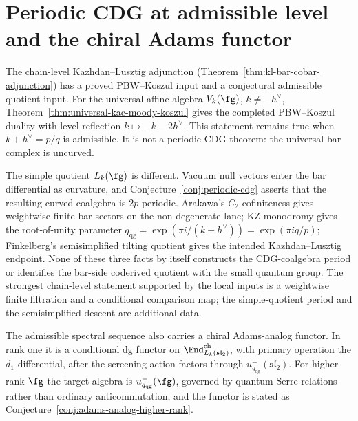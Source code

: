 %
%

\chapter{Periodic CDG at admissible level and the chiral Adams functor}
\label{chap:periodic-cdg-admissible}

The chain-level Kazhdan--Lusztig adjunction
\textup{(}Theorem~\ref{thm:kl-bar-cobar-adjunction}\textup{)} has a
proved PBW--Koszul input and a conjectural admissible quotient input.
For the universal affine algebra $V_k(\fg)$, $k\neq -h^\vee$,
Theorem~\ref{thm:universal-kac-moody-koszul} gives the completed
PBW--Koszul duality with level reflection $k\mapsto -k-2h^\vee$.
This statement remains true when $k+h^\vee=p/q$ is admissible.  It is
not a periodic-CDG theorem: the universal bar complex is uncurved.

The simple quotient $L_k(\fg)$ is different.  Vacuum null vectors enter
the bar differential as curvature, and Conjecture~\ref{conj:periodic-cdg}
asserts that the resulting curved coalgebra is $2p$-periodic.  Arakawa's
$C_2$-cofiniteness gives weightwise finite bar sectors on the
non-degenerate lane; KZ monodromy gives the root-of-unity parameter
$q_{\mathrm{qg}}=\exp(\pi i/(k+h^\vee))=\exp(\pi i q/p)$; Finkelberg's
semisimplified tilting quotient gives the intended Kazhdan--Lusztig
endpoint.  None of these three facts by itself constructs the
CDG-coalgebra period or identifies the bar-side coderived quotient with
the small quantum group.  The strongest chain-level statement supported
by the local inputs is a weightwise finite filtration and a conditional
comparison map; the simple-quotient period and the semisimplified
descent are additional data.

The admissible spectral sequence also carries a chiral Adams-analog
functor.  In rank one it is a conditional
dg functor on $\End^{\mathrm{ch}}_{L_k(\mathfrak{sl}_2)}$, with
primary operation the $d_1$ differential, after the screening action
factors through $u_{q_{\mathrm{qg}}}^-(\mathfrak{sl}_2)$.  For
higher-rank $\fg$ the target algebra is
$u_{q_{\mathrm{qg}}}^-(\fg)$, governed by quantum Serre relations
rather than ordinary anticommutation, and the functor is stated as
Conjecture~\ref{conj:adams-analog-higher-rank}.

